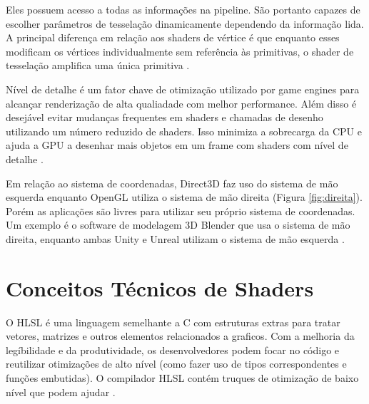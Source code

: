 Eles possuem acesso a todas as informações na pipeline. São portanto capazes de escolher parâmetros de tesselação dinamicamente dependendo da informação lida. A principal diferença em relação aos shaders de vértice é que enquanto esses modificam os vértices individualmente sem referência às primitivas, o shader de tesselação amplifica uma única primitiva \cite{hasu2018modern}.

Nível de detalhe é um fator chave de otimização utilizado por game engines para alcançar renderização de alta qualiadade com melhor performance. Além disso é desejável evitar mudanças frequentes em shaders e chamadas de desenho utilizando um número reduzido de shaders. Isso minimiza a sobrecarga da CPU e ajuda a GPU a desenhar mais objetos em um frame com shaders com nível de detalhe \cite{yong2015rapid}.

Em relação ao sistema de coordenadas, Direct3D faz uso do sistema de mão esquerda enquanto OpenGL utiliza o sistema de mão direita (Figura \ref{fig:direita}). Porém as aplicações são livres para utilizar seu próprio sistema de coordenadas. Um exemplo é o software de modelagem 3D Blender que usa o sistema de mão direita, enquanto ambas Unity e Unreal utilizam o sistema de mão esquerda \cite{hasu2018modern}.

	\begin{figure}[h!]
		\centering
	\end{figure}
	\nocite{direita}

\section{Conceitos Técnicos de Shaders}
\label{sec:conceitos-tecnicos-shaders}

O HLSL é uma linguagem semelhante a C com estruturas extras para tratar vetores, matrizes e outros elementos relacionados a graficos. Com a melhoria da legíbilidade e da produtividade, os desenvolvedores podem focar no código e reutilizar otimizações de alto nível (como fazer uso de tipos correspondentes e funções embutidas). O compilador HLSL contém truques de otimização de baixo nível que podem ajudar \cite{riguer2002performance}.

